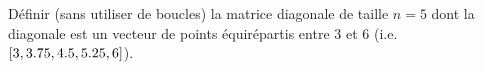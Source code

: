 Définir (sans utiliser de boucles) la matrice diagonale de taille $n = 5$ dont la diagonale est un vecteur de points équirépartis entre $3$ et $6$ (i.e. $\squared{3, 3.75, 4.5, 5.25, 6}$).
